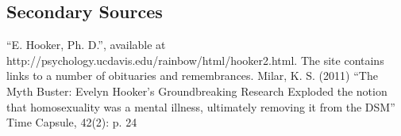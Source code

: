 \subsection{Secondary Sources}
\label{secondarysources}

“E. Hooker, Ph. D.”, available at http:\slash \slash psychology.ucdavis.edu\slash rainbow\slash html\slash hooker2.html. The site contains links to a number of obituaries and remembrances.
Milar, K. S. (2011) “The Myth Buster: Evelyn Hooker's Groundbreaking Research Exploded the notion that homosexuality was a mental illness, ultimately removing it from the DSM” Time Capsule, 42(2): p. 24




